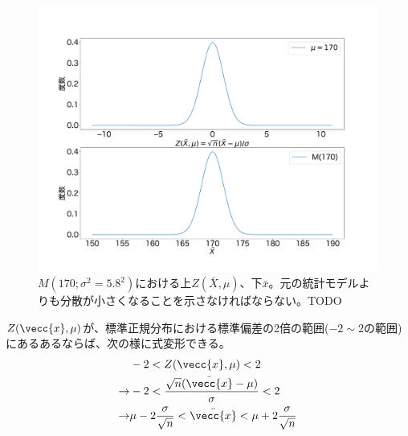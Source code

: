 \begin{figure}
    \begin{center}
        \includegraphics[width=15cm]{./image/03_/normal_Z_frequency.pdf}
        \caption{$M(170;\sigma^2=5.8^2)$における上$Z(\bar{X},\mu)$、下$\bar{x}$。元の統計モデルよりも分散が小さくなることを示さなければならない。TODO}
        \label{fig:cm_standard_normal_distribution}
    \end{center}
\end{figure}
\fi


$Z(\vecc{x},\mu)$が、標準正規分布における標準偏差の2倍の範囲($-2 \sim 2$の範囲)にあるあるならば、次の様に式変形できる。
\begin{eqnarray*}
    & -2 < Z(\vecc{x},\mu)<2 \\
\rightarrow & -2 < \frac{\sqrt{n}(\bar{\vecc{x}}-\mu)}{\sigma}  <2 \\
\rightarrow & \mu - 2 \frac{\sigma}{\sqrt{n}} < \bar{\vecc{x}} < \mu + 2\frac{\sigma}{\sqrt{n}}
\end{eqnarray*}

